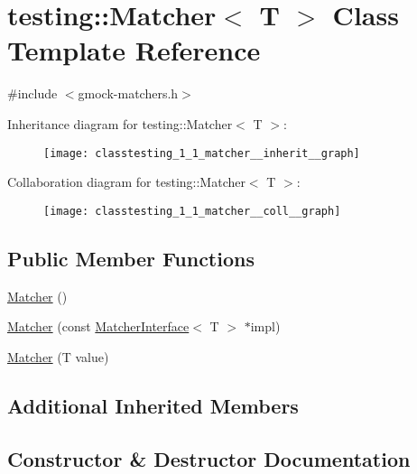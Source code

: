 \hypertarget{classtesting_1_1_matcher}{}\section{testing\+:\+:Matcher$<$ T $>$ Class Template Reference}
\label{classtesting_1_1_matcher}


{\ttfamily \#include $<$gmock-\/matchers.\+h$>$}



Inheritance diagram for testing\+:\+:Matcher$<$ T $>$\+:
\nopagebreak
\begin{figure}[H]
\begin{center}
\leavevmode
\texttt{[image: classtesting\_1\_1\_matcher\_\_inherit\_\_graph]}
\end{center}
\end{figure}


Collaboration diagram for testing\+:\+:Matcher$<$ T $>$\+:
\nopagebreak
\begin{figure}[H]
\begin{center}
\leavevmode
\texttt{[image: classtesting\_1\_1\_matcher\_\_coll\_\_graph]}
\end{center}
\end{figure}
\subsection*{Public Member Functions}
\begin{DoxyCompactItemize}
\item 
\hyperlink{classtesting_1_1_matcher_a57bfc9e62d7f6acfee5ad88d1077931c}{Matcher} ()
\item 
\hyperlink{classtesting_1_1_matcher_aea32eb3f86233853de91929fb2691bf3}{Matcher} (const \hyperlink{classtesting_1_1_matcher_interface}{Matcher\+Interface}$<$ T $>$ $\ast$impl)
\item 
\hyperlink{classtesting_1_1_matcher_adc75e0bd47ffc75ba8a5f760372d0493}{Matcher} (T value)
\end{DoxyCompactItemize}
\subsection*{Additional Inherited Members}


\subsection{Constructor \& Destructor Documentation}
